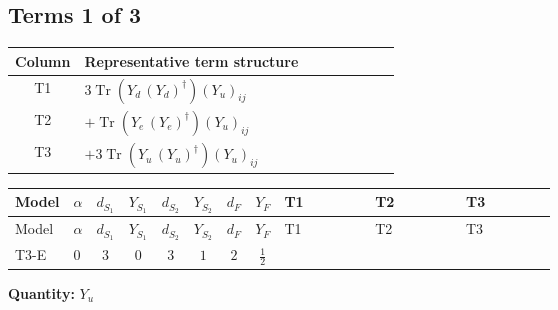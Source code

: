 \documentclass[8pt]{article}
\begin{document}
\begin{landscape}
\subsection*{Terms 1 of 3}
\begin{center}
\begin{tabular}{@{}c >{\raggedright\arraybackslash}p{0.82\linewidth}@{}}
\toprule
Column & Representative term structure \\
\midrule
T1 & \(\displaystyle 3 \operatorname{Tr}\!\left({Y_d}\,\left({Y_d}\right)^{\dagger}\right) \left({Y_u}\right)_{ij}\) \\
\midrule
T2 & \(\displaystyle +\operatorname{Tr}\!\left({Y_e}\,\left({Y_e}\right)^{\dagger}\right) \left({Y_u}\right)_{ij}\) \\
\midrule
T3 & \(\displaystyle +3 \operatorname{Tr}\!\left({Y_u}\,\left({Y_u}\right)^{\dagger}\right) \left({Y_u}\right)_{ij}\) \\
\midrule
\bottomrule
\end{tabular}
\end{center}
\smallskip
\tiny
\begin{longtable}{@{}llcccccc >{\raggedright\arraybackslash}p{0.21\linewidth} >{\raggedright\arraybackslash}p{0.21\linewidth} >{\raggedright\arraybackslash}p{0.21\linewidth}@{}}
\toprule
Model & $\alpha$ & $d_{S_1}$ & $Y_{S_1}$ & $d_{S_2}$ & $Y_{S_2}$ & $d_F$ & $Y_F$ & T1 & T2 & T3 \\
\midrule
\endfirsthead
\toprule
Model & $\alpha$ & $d_{S_1}$ & $Y_{S_1}$ & $d_{S_2}$ & $Y_{S_2}$ & $d_F$ & $Y_F$ & T1 & T2 & T3 \\
\midrule
\endhead
T3-E & $0$ & $3$ & $0$ & $3$ & $1$ & $2$ & $\frac{1}{2}$ & \scriptsize\adjustbox{max width=\linewidth}{$\begin{gathered} 3 \operatorname{Tr}\!\left({Y_d}\,\left({Y_d}\right)^{\dagger}\right) \left({Y_u}\right)_{ij}\end{gathered}$} & \scriptsize\adjustbox{max width=\linewidth}{$\begin{gathered} +\operatorname{Tr}\!\left({Y_e}\,\left({Y_e}\right)^{\dagger}\right) \left({Y_u}\right)_{ij}\end{gathered}$} & \scriptsize\adjustbox{max width=\linewidth}{$\begin{gathered} +3 \operatorname{Tr}\!\left({Y_u}\,\left({Y_u}\right)^{\dagger}\right) \left({Y_u}\right)_{ij}\end{gathered}$} \\
\midrule
\bottomrule
\end{longtable}
\clearpage
\noindent\textbf{Quantity: }$Y_u$\par\smallskip

\end{landscape}
\end{document}
